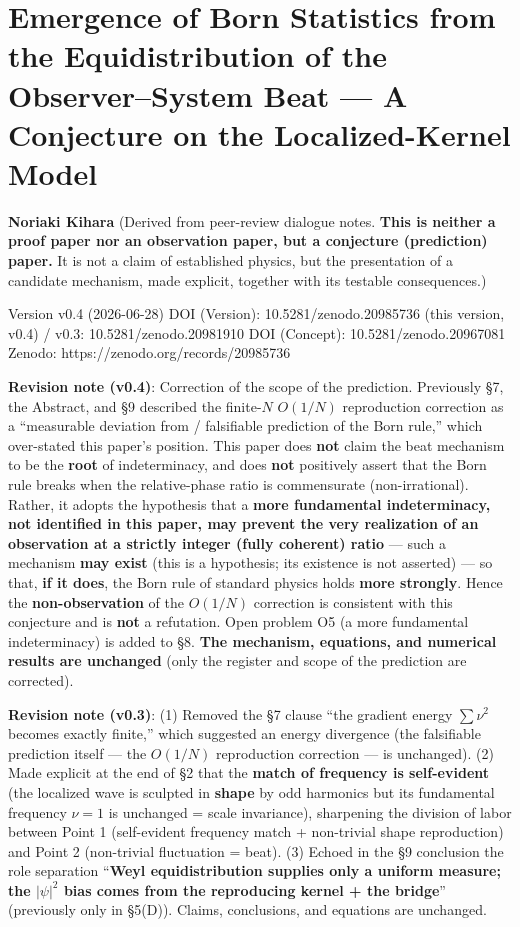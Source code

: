 \documentclass[
]{ltjsarticle}
\author{}
\date{}
\begin{document}
\section{Emergence of Born Statistics from the Equidistribution of the
Observer--System Beat --- A Conjecture on the Localized-Kernel
Model}\label{emergence-of-born-statistics-from-the-equidistribution-of-the-observersystem-beat-a-conjecture-on-the-localized-kernel-model}

\textbf{Noriaki Kihara} (Derived from peer-review dialogue notes.
\textbf{This is neither a proof paper nor an observation paper, but a
conjecture (prediction) paper.} It is not a claim of established
physics, but the presentation of a candidate mechanism, made explicit,
together with its testable consequences.)

Version v0.4 (2026-06-28) DOI (Version): 10.5281/zenodo.20985736 (this
version, v0.4) / v0.3: 10.5281/zenodo.20981910 DOI (Concept):
10.5281/zenodo.20967081 Zenodo: https://zenodo.org/records/20985736

\textbf{Revision note (v0.4)}: Correction of the scope of the
prediction. Previously §7, the Abstract, and §9 described the
finite-\(N\) \(O(1/N)\) reproduction correction as a ``measurable
deviation from / falsifiable prediction of the Born rule,'' which
over-stated this paper's position. This paper does \textbf{not} claim
the beat mechanism to be the \textbf{root} of indeterminacy, and does
\textbf{not} positively assert that the Born rule breaks when the
relative-phase ratio is commensurate (non-irrational). Rather, it adopts
the hypothesis that a \textbf{more fundamental indeterminacy, not
identified in this paper, may prevent the very realization of an
observation at a strictly integer (fully coherent) ratio} --- such a
mechanism \textbf{may exist} (this is a hypothesis; its existence is not
asserted) --- so that, \textbf{if it does}, the Born rule of standard
physics holds \textbf{more strongly}. Hence the \textbf{non-observation}
of the \(O(1/N)\) correction is consistent with this conjecture and is
\textbf{not} a refutation. Open problem O5 (a more fundamental
indeterminacy) is added to §8. \textbf{The mechanism, equations, and
numerical results are unchanged} (only the register and scope of the
prediction are corrected).

\textbf{Revision note (v0.3)}: (1) Removed the §7 clause ``the gradient
energy \(\sum\nu^2\) becomes exactly finite,'' which suggested an energy
divergence (the falsifiable prediction itself --- the \(O(1/N)\)
reproduction correction --- is unchanged). (2) Made explicit at the end
of §2 that the \textbf{match of frequency is self-evident} (the
localized wave is sculpted in \textbf{shape} by odd harmonics but its
fundamental frequency \(\nu=1\) is unchanged = scale invariance),
sharpening the division of labor between Point 1 (self-evident frequency
match + non-trivial shape reproduction) and Point 2 (non-trivial
fluctuation = beat). (3) Echoed in the §9 conclusion the role separation
``\textbf{Weyl equidistribution supplies only a uniform measure; the
\(|\psi|^2\) bias comes from the reproducing kernel + the bridge}''
(previously only in §5(D)). Claims, conclusions, and equations are
unchanged.
\end{document}
